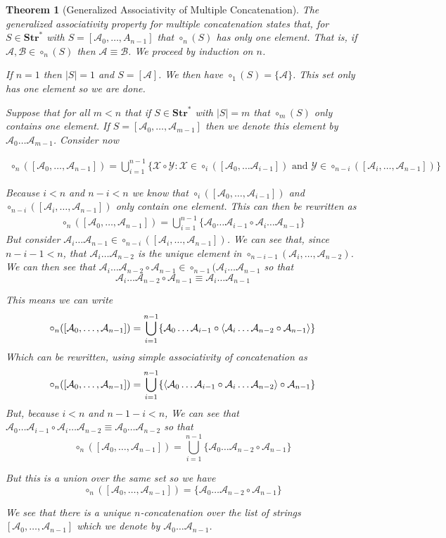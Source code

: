 \documentclass[12pt]{article}
\theoremstyle{break}
\theoremstyle{break}
\newtheorem{theorem}{Theorem}[section]
\theoremstyle{break}
\theoremstyle{break}
\newcommand{\mc}[1]{\mathcal{#1}}
\begin{document}
\begin{theorem}[Generalized Associativity of Multiple Concatenation]
The generalized associativity property for multiple concatenation states that, for $S\in\textbf{Str}^*$ with $S=[\mc{A}_0,\ldots,A_{n-1}]$ that $\circ_n(S)$ has only one element.
That is, if $\mc{A}, \mc{B}\in\circ_n(S)$ then $\mc{A}\equiv \mc{B}$.
We proceed by induction on $n$.

If $n=1$ then $|S|=1$ and $S = [\mc{A}]$.
We then have $\circ_1(S) = \{\mc{A}\}$.
This set only has one element so we are done.

Suppose that for all $m<n$ that if $S\in\textbf{Str}^*$ with $|S|=m$ that $\circ_m(S)$ only contains one element.
If $S = [\mc{A}_0,\ldots, \mc{A}_{m-1}]$ then we denote this element by $\mc{A}_0\ldots\mc{A}_{m-1}$.
Consider now

\begin{align*}
\circ_n([\mc{A}_0,\ldots, \mc{A}_{n-1}]) = \bigcup_{i=1}^{n-1} \{\mc{X}\circ\mc{Y}:\mc{X} \in \circ_i([\mc{A}_0,\ldots \mc{A}_{i-1}]) \text{ and } \mc{Y}\in \circ_{n-i}([\mc{A}_{i}, \ldots, \mc{A}_{n-1}])\}
\end{align*}

Because $i<n$ and $n-i<n$ we know that $\circ_i([\mc{A}_0,\ldots, \mc{A}_{i-1}])$ and $\circ_{n-i}([\mc{A}_i,\ldots,\mc{A}_{n-1}])$ only contain one element.
This can then be rewritten as
\begin{align}
\circ_n([\mc{A}_0,\ldots,\mc{A}_{n-1}]) = \bigcup_{i=1}^{n-1} \{\mc{A}_0\ldots\mc{A}_{i-1} \circ \mc{A}_i\ldots\mc{A}_{n-1}\}
\end{align}
But consider $\mc{A}_i\ldots\mc{A}_{n-1} \in \circ_{n-i}([\mc{A}_i,\ldots,\mc{A}_{n-1}])$.
We can see that, since $n-i-1 < n$, that $\mc{A}_i\ldots\mc{A}_{n-2}$ is the unique element in $\circ_{n-i-1}(\mc{A}_i,\ldots,\mc{A}_{n-2})$. 
We can then see that $\mc{A}_i\ldots\mc{A}_{n-2}\circ\mc{A}_{n-1} \in \circ_{n-1}(\mc{A}_i\ldots\mc{A}_{n-1}$ so that
$$
\mc{A}_i\ldots\mc{A}_{n-2}\circ\mc{A}_{n-1} \equiv \mc{A}_i\ldots\mc{A}_{n-1}
$$

This means we can write
$$
\circ_n([\mc{A}_0,\ldots,\mc{A}_{n-1}]) = \bigcup_{i=1}^{n-1} \{\mc{A}_0\ldots\mc{A}_{i-1} \circ \Braket{\mc{A}_i\ldots\mc{A}_{n-2}\circ\mc{A}_{n-1}}\}
$$
Which can be rewritten, using simple associativity of concatenation as
$$
\circ_n([\mc{A}_0,\ldots,\mc{A}_{n-1}]) = \bigcup_{i=1}^{n-1} \{\Braket{\mc{A}_0\ldots\mc{A}_{i-1} \circ \mc{A}_i\ldots\mc{A}_{n-2}}\circ\mc{A}_{n-1}\}
$$
But, because $i<n$ and $n-1-i<n$, We can see that $\mc{A}_0\ldots\mc{A}_{i-1}\circ \mc{A}_i\ldots\mc{A}_{n-2} \equiv \mc{A}_0\ldots \mc{A}_{n-2}$ so that
$$
\circ_n([\mc{A}_0,\ldots,\mc{A}_{n-1}]) = \bigcup_{i=1}^{n-1} \{\mc{A}_0\ldots\mc{A}_{n-2} \circ \mc{A}_{n-1} \}
$$

But this is a union over the same set so we have
$$
\circ_n([\mc{A}_0,\ldots,\mc{A}_{n-1}]) = \{\mc{A}_0\ldots\mc{A}_{n-2} \circ \mc{A}_{n-1} \}
$$

We see that there is a unique $n$-concatenation over the list of strings $[\mc{A}_0, \ldots, \mc{A}_{n-1}]$ which we denote by $\mc{A}_0\ldots\mc{A}_{n-1}$.

\end{theorem}
\end{document}
